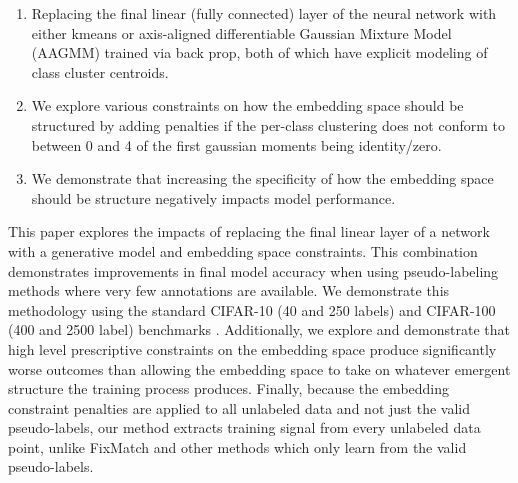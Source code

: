 \documentclass[10pt,twocolumn,letterpaper]{article}
\begin{document}
\begin{enumerate}
	\item Replacing the final linear (fully connected) layer of the neural network with either kmeans \cite{dwibedi2021little} or axis-aligned differentiable Gaussian Mixture Model (AAGMM) trained via back prop, both of which have explicit modeling of class cluster centroids. 
	\item We explore various constraints on how the embedding space should be structured by adding penalties if the per-class clustering does not conform to between 0 and 4 of the first gaussian moments being identity/zero.
	\item We demonstrate that increasing the specificity of how the embedding space should be structure negatively impacts model performance. \cite{pearson1936method}
\end{enumerate}

This paper explores the impacts of replacing the final linear layer of a network with a generative model and embedding space constraints.
This combination demonstrates improvements in final model accuracy when using pseudo-labeling methods where very few annotations are available.
We demonstrate this methodology using the standard CIFAR-10 (40 and 250 labels) and CIFAR-100 (400 and 2500 label) benchmarks \cite{cifar10}. 
Additionally, we explore and demonstrate that high level prescriptive constraints on the embedding space produce significantly worse outcomes than allowing the embedding space to take on whatever emergent structure the training process produces. 
Finally, because the embedding constraint penalties are applied to all unlabeled data and not just the valid pseudo-labels, our method extracts training signal from every unlabeled data point, unlike FixMatch \cite{sohn2020fixmatch} and other methods which only learn from the valid pseudo-labels.


\end{document}
